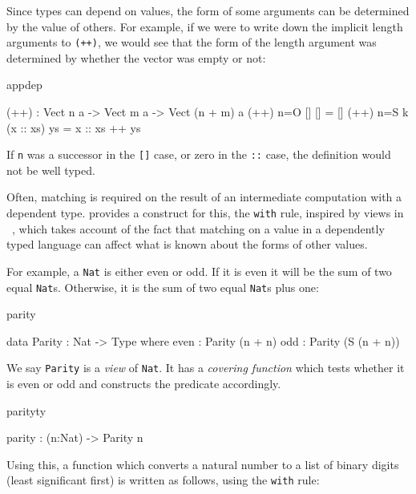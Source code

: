 Since types can depend on values, the form of some arguments can be determined
by the value of others. For example, if we were to write down the implicit
length arguments to \texttt{(++)}, we would see that the form of the length argument was
determined by whether the vector was empty or not:

\begin{SaveVerbatim}{appdep}

(++) : Vect n a -> Vect m a -> Vect (n + m) a
(++) {n=O}   []        [] = []
(++) {n=S k} (x :: xs) ys = x :: xs ++ ys

\end{SaveVerbatim}

\noindent
If \texttt{n} was a successor in the \texttt{[]} case, or zero in the 
\texttt{::} case, the definition
would not be well typed.

Often, matching is required on the result of an intermediate computation
with a dependent type.
\Idris{} provides a construct for this, the \texttt{with} rule, 
inspired by views in \Epigram~\cite{McBride2004a},
which takes account of the
fact that matching on a value in a dependently typed language can affect what
is known about the forms of other values. 

For example, a \texttt{Nat} is either even or odd. 
If it is even it will
be the sum of two equal \texttt{Nat}s. Otherwise, it is the sum of two equal \texttt{Nat}s 
plus one:

\begin{SaveVerbatim}{parity}

data Parity : Nat -> Type where
   even : Parity (n + n)
   odd  : Parity (S (n + n))

\end{SaveVerbatim}

\noindent
We say \texttt{Parity} is a \emph{view} of \texttt{Nat}. 
It has a \emph{covering function} which tests whether
it is even or odd and constructs the predicate accordingly.

\begin{SaveVerbatim}{parityty}

parity : (n:Nat) -> Parity n

\end{SaveVerbatim}

\noindent
Using this, a function which converts a natural number to a list
of binary digits (least significant first) is written as follows, using the \texttt{with}
rule:

